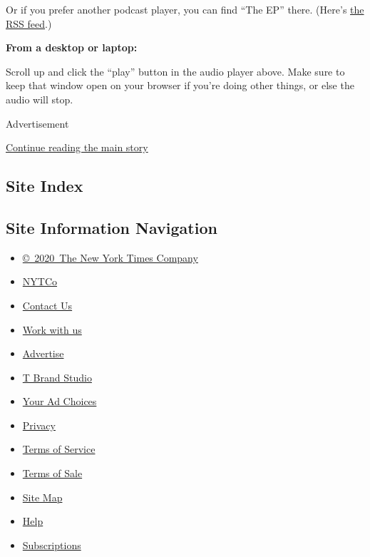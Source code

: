 Or if you prefer another podcast player, you can find ``The EP'' there.
(Here's \href{http://feeds.podtrac.com/tv8uQCHfz8e2}{the RSS feed}.)

\textbf{From a desktop or laptop:}

Scroll up and click the ``play'' button in the audio player above. Make
sure to keep that window open on your browser if you're doing other
things, or else the audio will stop.

Advertisement

\protect\hyperlink{after-bottom}{Continue reading the main story}

\hypertarget{site-index}{%
\subsection{Site Index}\label{site-index}}

\hypertarget{site-information-navigation}{%
\subsection{Site Information
Navigation}\label{site-information-navigation}}

\begin{itemize}
\tightlist
\item
  \href{https://help.nytimes3xbfgragh.onion/hc/en-us/articles/115014792127-Copyright-notice}{©~2020~The
  New York Times Company}
\end{itemize}

\begin{itemize}
\tightlist
\item
  \href{https://www.nytco.com/}{NYTCo}
\item
  \href{https://help.nytimes3xbfgragh.onion/hc/en-us/articles/115015385887-Contact-Us}{Contact
  Us}
\item
  \href{https://www.nytco.com/careers/}{Work with us}
\item
  \href{https://nytmediakit.com/}{Advertise}
\item
  \href{http://www.tbrandstudio.com/}{T Brand Studio}
\item
  \href{https://www.nytimes3xbfgragh.onion/privacy/cookie-policy\#how-do-i-manage-trackers}{Your
  Ad Choices}
\item
  \href{https://www.nytimes3xbfgragh.onion/privacy}{Privacy}
\item
  \href{https://help.nytimes3xbfgragh.onion/hc/en-us/articles/115014893428-Terms-of-service}{Terms
  of Service}
\item
  \href{https://help.nytimes3xbfgragh.onion/hc/en-us/articles/115014893968-Terms-of-sale}{Terms
  of Sale}
\item
  \href{https://spiderbites.nytimes3xbfgragh.onion}{Site Map}
\item
  \href{https://help.nytimes3xbfgragh.onion/hc/en-us}{Help}
\item
  \href{https://www.nytimes3xbfgragh.onion/subscription?campaignId=37WXW}{Subscriptions}
\end{itemize}

